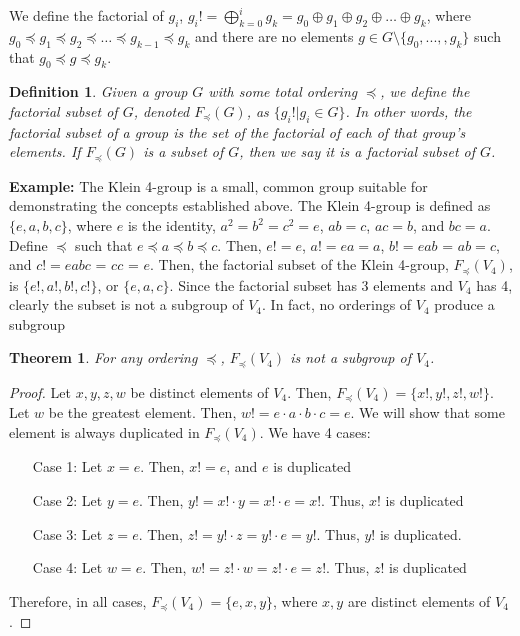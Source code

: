 \documentclass{article}
\newtheorem{theorem}{Theorem}
\newtheorem{definition}{Definition}
\begin{document}
We define the factorial of $g_i$, $g_i! = \bigoplus_{k=0}^{i} g_k = g_0 \oplus g_1 \oplus g_2 \oplus \ldots \oplus g_k$, where $g_0\preceq g_1\preceq g_2 \preceq \ldots \preceq g_{k-1} \preceq g_k$ and there are no elements $g\in G\setminus\{g_0,...,,g_k\}$ such that $g_0\preceq g\preceq g_k$.
\begin{definition}
Given a group $G$ with some total ordering $\preceq$, we define the \textit{factorial subset} of $G$, denoted $F_\preceq(G)$, as $\{g_i! | g_i \in G\}$. In other words, the factorial subset of a group is the set of the factorial of each of that group's elements. If $F_\preceq(G)$ is a subset of $G$, then we say it is a \textit{factorial subset} of $G$. 
\end{definition}

\textbf{Example:} The Klein 4-group is a small, common group suitable for demonstrating the concepts established above. The Klein 4-group is defined as $\{e,a,b,c\}$, where $e$ is the identity, $a^2 = b^2 = c^2 = e$, $ab = c$, $ac = b$, and
$bc = a$. Define $\preceq$ such that $e\preceq a \preceq b \preceq c$. Then, $e! = e$, $a! = ea = a$, $b! = eab$ = $ab = c$, and $c! = eabc$ = $cc$ = $e$. Then, the factorial subset of the Klein 4-group, $F_\preceq(V_4)$, is $\{e!,a!,b!,c!\}$, or $\{e,a,c\}$. Since the factorial subset has 3 elements and $V_4$ has 4, clearly the subset is not a subgroup of $V_4$. In fact, no orderings of $V_4$ produce a subgroup
\begin{theorem}
For any ordering $\preceq$, $F_\preceq(V_4)$ is not a subgroup of $V_4$.
\end{theorem}
\begin{proof}
Let $x,y,z,w$ be distinct elements of $V_4$. Then, $F_\preceq(V_4) = \{x!,y!,z!,w!\}$. Let $w$ be the greatest element. Then, $w! = e\cdot a\cdot b\cdot c = e$. We will show that some element is always duplicated in $F_\preceq(V_4)$. We have 4 cases:
\begin{itemize}
    \item[Case 1:] Let $x=e$. Then, $x! = e$, and $e$ is duplicated
    \item[Case 2:] Let $y=e$. Then, $y! = x!\cdot y = x!\cdot e = x!$. Thus, $x!$ is duplicated
    \item[Case 3:] Let $z=e$. Then, $z! = y!\cdot z = y!\cdot e = y!$. Thus, $y!$ is duplicated.
    \item[Case 4:] Let $w=e$. Then, $w! = z! \cdot w = z!\cdot e = z!$. Thus, $z!$ is duplicated
\end{itemize}
Therefore, in all cases, $F_\preceq(V_4) = \{e,x,y\}$, where $x,y$ are distinct elements of $V_4$. 
\end{proof}
\end{document}
